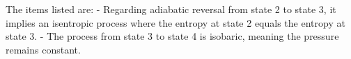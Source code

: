The items listed are:
- Regarding adiabatic reversal from state 2 to state 3, it implies an isentropic process where the entropy at state 2 equals the entropy at state 3.
- The process from state 3 to state 4 is isobaric, meaning the pressure remains constant.